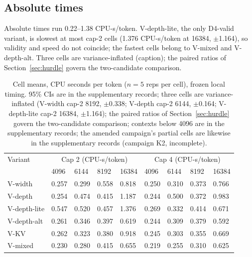 \documentclass[10pt,letterpaper,twocolumn]{article}
\begin{document}
\subsection{Absolute times}
Absolute times run 0.22--1.38 CPU-s/token. V-depth-lite, the
only D4-valid variant, is slowest at most cap-2 cells (1.376
CPU-s/token at 16384, $\pm$1.164), so validity and speed do not
coincide; the fastest cells belong to V-mixed and V-depth-alt.
Three cells are variance-inflated (caption); the paired ratios
of Section~\ref{sec:hurdle} govern the two-candidate comparison.
\begin{table}[ht]
\centering\scriptsize\setlength{\tabcolsep}{3pt}
\begin{tabular}{@{}lllllllll@{}}
\toprule
Variant & \multicolumn{4}{c}{Cap 2 (CPU-s/token)} & \multicolumn{4}{c}{Cap 4 (CPU-s/token)} \\
 & 4096 & 6144 & 8192 & 16384 & 4096 & 6144 & 8192 & 16384 \\
\midrule
V-width & 0.257 & 0.299 & 0.558 & 0.818 & 0.250 & 0.310 & 0.373 & 0.766 \\
V-depth & 0.254 & 0.474 & 0.415 & 1.187 & 0.244 & 0.500 & 0.372 & 0.983 \\
V-depth-lite & 0.547 & 0.520 & 0.457 & 1.376 & 0.269 & 0.332 & 0.414 & 0.671 \\
V-depth-alt & 0.261 & 0.346 & 0.397 & 0.619 & 0.244 & 0.309 & 0.379 & 0.592 \\
V-KV & 0.262 & 0.323 & 0.380 & 0.918 & 0.245 & 0.303 & 0.355 & 0.669 \\
V-mixed & 0.230 & 0.280 & 0.415 & 0.655 & 0.219 & 0.255 & 0.310 & 0.625 \\
\bottomrule
\end{tabular}
\caption{Cell means, CPU seconds per token ($n=5$ reps per cell),
frozen local timing. 95\% CIs are in the supplementary records;
three cells are variance-inflated (V-width cap-2 8192,
$\pm$0.338; V-depth cap-2 6144, $\pm$0.164; V-depth-lite cap-2
16384, $\pm$1.164); the paired ratios of Section~\ref{sec:hurdle} govern the two-candidate comparison; contexts below 4096 are in the supplementary records; the amended campaign's partial cells are likewise in the supplementary records (campaign K2, incomplete).}
\end{table}
\end{document}
